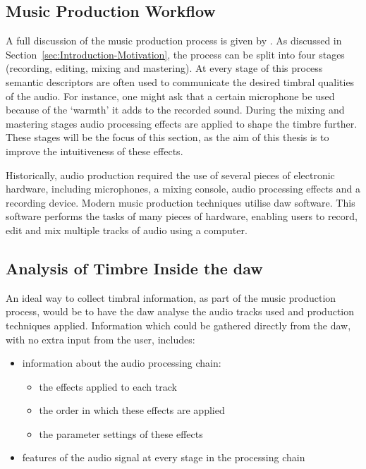 	\subsection{Music Production Workflow}
	\label{sec:TimbreEvaluation-DAWBasedTimbreEvaluation-Workflow}
		A full discussion of the music production process is given by \citet{dittmar2013audio}. As discussed in
		Section~\ref{sec:Introduction-Motivation}, the process can be split into four stages (recording, editing,
		mixing and mastering). At every stage of this process semantic descriptors are often used to communicate
		the desired timbral qualities of the audio. For instance, one might ask that a certain microphone be used
		because of the `warmth' it adds to the recorded sound. During the mixing and mastering stages audio
		processing effects are applied to shape the timbre further. These stages will be the focus of this
		section, as the aim of this thesis is to improve the intuitiveness of these effects.

		Historically, audio production required the use of several pieces of electronic hardware, including
		microphones, a mixing console, audio processing effects and a recording device. Modern music production
		techniques utilise \acrfull{daw} software. This software performs the tasks of many pieces of hardware,
		enabling users to record, edit and mix multiple tracks of audio using a computer. 
		
	\subsection{Analysis of Timbre Inside the \acrshort{daw}}
	\label{sec:TimbreEvaluation-DAWBasedTimbreEvaluation-InDAW}
		An ideal way to collect timbral information, as part of the music production process, would be to have the
		\acrshort{daw} analyse the audio tracks used and production techniques applied. Information which could be
		gathered directly from the \acrshort{daw}, with no extra input from the user, includes:

		\begin{itemize}
			\item information about the audio processing chain:
			\begin{itemize}
				\item the effects applied to each track
				\item the order in which these effects are applied
				\item the parameter settings of these effects
			\end{itemize}
			\item features of the audio signal at every stage in the processing chain
		\end{itemize}

